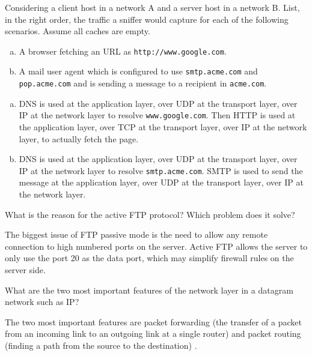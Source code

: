 \begin{Exercise}
Considering a client host in a network A and a server host in a network B. List, in the right order, the traffic a sniffer would capture for each of the following scenarios.
Assume all caches are empty.
\begin{enumerate}[a)]
\item A browser fetching an URL as \texttt{http://www.google.com}.
\item A mail user agent which is configured to use \texttt{smtp.acme.com} and \texttt{pop.acme.com} and is sending a message to a recipient in \texttt{acme.com}.
\end{enumerate}
\end{Exercise}
\begin{Answer}
\begin{enumerate}[a)]
\item DNS is used at the application layer, over UDP at the transport layer, over IP at the network layer to resolve \texttt{www.google.com}.
Then HTTP is used at the application layer, over TCP at the transport layer, over IP at the network layer, to actually fetch the page.
\item DNS is used at the application layer, over UDP at the transport layer, over IP at the network layer to resolve \texttt{smtp.acme.com}.
SMTP is used to send the message at the application layer, over UDP at the transport layer, over IP at the network layer.
\end{enumerate}
\end{Answer}

\begin{Exercise}
What is the reason for the active FTP protocol? Which problem does it solve?
\end{Exercise}
\begin{Answer}
The biggest issue of FTP passive mode is the need to allow any remote connection to high numbered ports on the server. Active FTP allows the server to only use the port 20 as the data port, which may simplify firewall rules on the server side.
\end{Answer}

\begin{Exercise}
What are the two most important features of the network layer in a datagram network such as IP?
\end{Exercise}
\begin{Answer}
The two most important features are packet forwarding (the transfer of a packet from an incoming link to an outgoing link at a single router) and packet routing (finding a path from the source to the destination) \cite[p.~305]{computer-networking-kurose-2012}.
\end{Answer}

